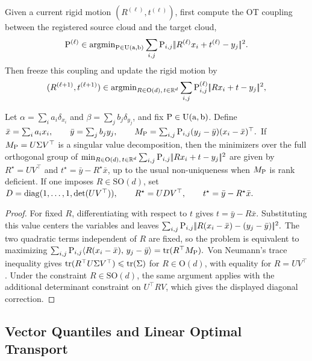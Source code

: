 Given a current rigid motion $(R^{(\ell)},t^{(\ell)})$, first compute the OT coupling between the registered source cloud and the target cloud,
\begin{equation}\label{eq-wasserstein-procrustes-coupling-update}
\P^{(\ell)}
\in
\argmin_{\P\in\CouplingsD(\a,\b)}
\sum_{i,j}\P_{i,j}\norm{R^{(\ell)}x_i+t^{(\ell)}-y_j}^2.
\end{equation}
Then freeze this coupling and update the rigid motion by
\begin{equation}\label{eq-wasserstein-procrustes-rigid-update}
(R^{(\ell+1)},t^{(\ell+1)})
\in
\argmin_{R\in\mathrm O(d),\,t\in\RR^d}
\sum_{i,j}\P^{(\ell)}_{i,j}\norm{Rx_i+t-y_j}^2,
\end{equation}
\begin{prop}\label{prop-wasserstein-procrustes-rigid-update}
Let $\alpha=\sum_i a_i\delta_{x_i}$ and $\beta=\sum_j b_j\delta_{y_j}$, and fix $\P\in\CouplingsD(\a,\b)$. Define
\(\bar x=\sum_i a_i x_i,\qquad \bar y=\sum_j b_j y_j,\qquad M_\P=\sum_{i,j} \P_{i,j}(y_j-\bar y)(x_i-\bar x)^\top.\)
If $M_\P=U\Sigma V^\top$ is a singular value decomposition, then the minimizers over the full orthogonal group of
\(\min_{R\in\mathrm O(d),\,t\in\RR^d} \sum_{i,j}\P_{i,j}\norm{Rx_i+t-y_j}^2\)
are given by $R^\star=UV^\top$ and $t^\star=\bar y-R^\star\bar x$, up to the usual non-uniqueness when $M_\P$ is rank deficient. If one imposes $R\in\mathrm{SO}(d)$, set
\(D=\diag(1,\ldots,1,\det(UV^\top)), \qquad R^\star=UDV^\top, \qquad t^\star=\bar y-R^\star\bar x.\)
\end{prop}
\begin{proof}
For fixed $R$, differentiating with respect to $t$ gives $t=\bar y-R\bar x$. Substituting this value centers the variables and leaves
\(\sum_{i,j}\P_{i,j}\norm{R(x_i-\bar x)-(y_j-\bar y)}^2.\)
The two quadratic terms independent of $R$ are fixed, so the problem is equivalent to maximizing
\(\sum_{i,j}\P_{i,j}\dotp{R(x_i-\bar x)}{y_j-\bar y} = \tr(R^\top M_\P).\)
Von Neumann's trace inequality gives $\tr(R^\top U\Sigma V^\top)\leq\tr(\Sigma)$ for $R\in\mathrm O(d)$, with equality for $R=UV^\top$. Under the constraint $R\in\mathrm{SO}(d)$, the same argument applies with the additional determinant constraint on $U^\top R V$, which gives the displayed diagonal correction.
\end{proof}
\subsection{Vector Quantiles and Linear Optimal Transport}
\label{sec-linear-ot}
\label{sec-vector-quantiles-linearized-transport}
